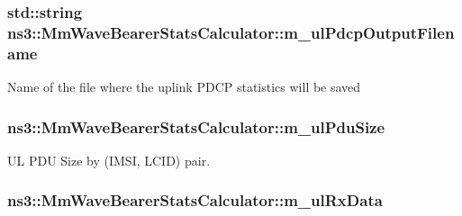 \subsubsection[{\texorpdfstring{m\+\_\+ul\+Pdcp\+Output\+Filename}{m_ulPdcpOutputFilename}}]{\setlength{\rightskip}{0pt plus 5cm}std\+::string ns3\+::\+Mm\+Wave\+Bearer\+Stats\+Calculator\+::m\+\_\+ul\+Pdcp\+Output\+Filename\hspace{0.3cm}{\ttfamily [private]}}\hypertarget{classns3_1_1MmWaveBearerStatsCalculator_a68cd58ed09f2f081e6af8486893e2fa6}{}\label{classns3_1_1MmWaveBearerStatsCalculator_a68cd58ed09f2f081e6af8486893e2fa6}
Name of the file where the uplink P\+D\+CP statistics will be saved 
\subsubsection[{\texorpdfstring{m\+\_\+ul\+Pdu\+Size}{m_ulPduSize}}]{ ns3\+::\+Mm\+Wave\+Bearer\+Stats\+Calculator\+::m\+\_\+ul\+Pdu\+Size\hspace{0.3cm}{\ttfamily [private]}}\hypertarget{classns3_1_1MmWaveBearerStatsCalculator_aa982b37ab01c0bdcd2f9182ad3c7986b}{}\label{classns3_1_1MmWaveBearerStatsCalculator_aa982b37ab01c0bdcd2f9182ad3c7986b}


UL P\+DU Size by (I\+M\+SI, L\+C\+ID) pair. 

\subsubsection[{\texorpdfstring{m\+\_\+ul\+Rx\+Data}{m_ulRxData}}]{ ns3\+::\+Mm\+Wave\+Bearer\+Stats\+Calculator\+::m\+\_\+ul\+Rx\+Data\hspace{0.3cm}{\ttfamily [private]}}\hypertarget{classns3_1_1MmWaveBearerStatsCalculator_a66ba48f736e0e823583210a1c6b77046}{}\label{classns3_1_1MmWaveBearerStatsCalculator_a66ba48f736e0e823583210a1c6b77046}


